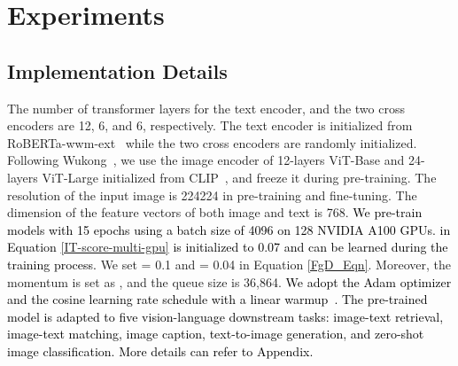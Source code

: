 \documentclass[sigconf]{acmart}
\def\blue{\textcolor{black}}
\def\mmljc{\textcolor{black}}
\def\mmcr{\textcolor{black}}
\begin{document}
\section{Experiments}
\subsection{Implementation Details}\label{sec:implementation}
The number of transformer layers for the text encoder, and the two cross encoders are 12, 6, and 6, respectively. 
The text encoder is initialized from RoBERTa-wwm-ext~\cite{chinesebert} while the two cross encoders are randomly initialized.
Following Wukong~\cite{gu2022wukong}, we use the image encoder of 12-layers ViT-Base and 24-layers ViT-Large initialized from CLIP~\cite{CLIP}, and freeze it during pre-training. 
The resolution of the input image is 224224 in pre-training and fine-tuning. The dimension of the feature vectors of both image and text is 768. \blue{We pre-train models with 15 epochs using a batch size of 4096 on 128 NVIDIA A100 GPUs.}
\mmcr{ in Equation \ref{IT-score-multi-gpu} is initialized to 0.07 and can be learned during the training process.}
We set = 0.1 and = 0.04 in Equation \ref{FgD_Eqn}.
Moreover, the momentum is set as , and the queue size is 36,864.
\blue{We adopt the Adam optimizer and the cosine learning rate schedule with a linear warmup~\cite{loshchilov2016sgdr}.}
\blue{The pre-trained model is adapted to five vision-language downstream tasks: image-text retrieval, image-text matching, image caption, text-to-image generation, and zero-shot image classification.}
\mmljc{More details can refer to Appendix.}
\end{document}
